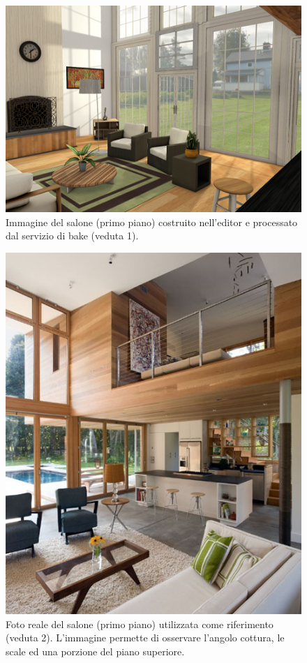 \begin{figure}[htb]
 \centering
 \includegraphics[width=0.9\linewidth]{images/chapter_prove_sperimentali/scena1_bake.png}\hfill
 \caption[Ambiente virtuale: Salone primo piano, veduta 1]{Immagine del salone (primo piano) costruito nell'editor e processato dal servizio di bake (veduta 1).}
 \label{fig:prove_sperimentali_qualita_visiva_scena1_bake}
\end{figure}
\begin{figure}[htb]
 \centering
 \includegraphics[width=1\linewidth]{images/chapter_prove_sperimentali/scena2_reale.jpg}\hfill
 \caption[Ambiente reale: Salone primo piano, veduta 2]{Foto reale del salone (primo piano) utilizzata come riferimento (veduta 2). L'immagine permette di osservare l'angolo cottura, le scale ed una porzione del piano superiore.}
 \label{fig:prove_sperimentali_qualita_visiva_scena2_reale}
\end{figure}
